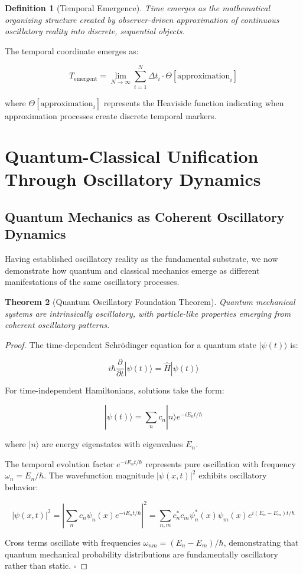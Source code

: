\documentclass[11pt,a4paper]{article}
\newtheorem{theorem}{Theorem}[section]
\newtheorem{definition}[theorem]{Definition}
\theoremstyle{remark}
\begin{document}
\begin{definition}[Temporal Emergence]
Time emerges as the mathematical organizing structure created by observer-driven approximation of continuous oscillatory reality into discrete, sequential objects.
\end{definition}

The temporal coordinate emerges as:

$$T_{\text{emergent}} = \lim_{N \to \infty} \sum_{i=1}^{N} \Delta t_i \cdot \Theta[\text{approximation}_i]$$

where $\Theta[\text{approximation}_i]$ represents the Heaviside function indicating when approximation processes create discrete temporal markers.

\section{Quantum-Classical Unification Through Oscillatory Dynamics}

\subsection{Quantum Mechanics as Coherent Oscillatory Dynamics}

Having established oscillatory reality as the fundamental substrate, we now demonstrate how quantum and classical mechanics emerge as different manifestations of the same oscillatory processes.

\begin{theorem}[Quantum Oscillatory Foundation Theorem]
Quantum mechanical systems are intrinsically oscillatory, with particle-like properties emerging from coherent oscillatory patterns.
\end{theorem}

\begin{proof}
The time-dependent Schrödinger equation for a quantum state $|\psi(t)\rangle$ is:

$$i\hbar \frac{\partial}{\partial t}|\psi(t)\rangle = \hat{H}|\psi(t)\rangle$$

For time-independent Hamiltonians, solutions take the form:

$$|\psi(t)\rangle = \sum_n c_n |n\rangle e^{-iE_n t/\hbar}$$

where $|n\rangle$ are energy eigenstates with eigenvalues $E_n$.

The temporal evolution factor $e^{-iE_n t/\hbar}$ represents pure oscillation with frequency $\omega_n = E_n/\hbar$. The wavefunction magnitude $|\psi(x,t)|^2$ exhibits oscillatory behavior:

$$|\psi(x,t)|^2 = \left|\sum_n c_n \psi_n(x) e^{-iE_n t/\hbar}\right|^2 = \sum_{n,m} c_n^* c_m \psi_n^*(x) \psi_m(x) e^{i(E_n - E_m)t/\hbar}$$

Cross terms oscillate with frequencies $\omega_{nm} = (E_n - E_m)/\hbar$, demonstrating that quantum mechanical probability distributions are fundamentally oscillatory rather than static. $\square$
\end{proof}
\end{document}
